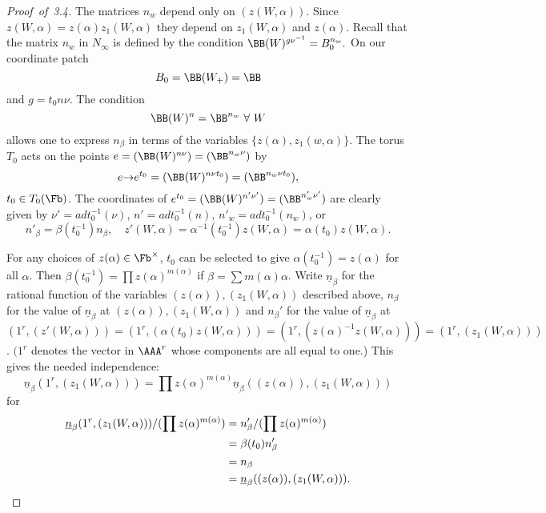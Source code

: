 \documentclass{memo-l}
\theoremstyle{definition}
\theoremstyle{remark}
\numberwithin{section}{chapter}
\numberwithin{equation}{chapter}
\begin{document}
\begin{proof}[Proof\ of\ 3.4]    The matrices $n_{w}$ depend only on $(z(W,{\alpha}))$. 
 Since $z(W,{\alpha}) = z({\alpha})z_{1}(W,{\alpha})$ they depend on 
$z_1(W,{\alpha})$ and $z({\alpha})$. 
 Recall that the matrix $n_{w}$ in $N_{{\infty}}$ is defined by the condition 
${\BB}(W)^{g\nu^{-1}} = B_{0}^{n_w}.$  
On our
coordinate patch $$B_{0} = {\BB}(W_{+})={\BB}$$ and $g = t_{0}n{\nu}$. 
 The condition $${\BB}(W)^n  = 
{\BB}^{n_w} \ \forall \ W$$ allows one to 
express $n_{{\beta}}$ in terms of the variables 
$\{z({\alpha}),z_{1}(w,\alpha)\}$.   The torus $T_{0}$ acts on the points 
$e = ({\BB}(W)^{n\nu}) = 
({\BB}^{n_w\nu})$ by $$e {\to} e^{t_0}  = ({\BB}(W)^{n\nu t_0}) = 
({\BB}^{n_w\nu t_0}),$$ $t_{0} \in T_{0}(\Fb)$. 
The coordinates of $e^{t_0}  = ({\BB}(W)^{n'{\nu}'}) = 
({\BB}^{n_{w}'{\nu}'})$ are clearly given by ${\nu}' = 
adt_0^{-1}({\nu})$, $n' = adt_0^{-1}(n)$, $n'_{w} = 
adt_0^{-1}(n_{w})$, or $$n'_{{\beta}} = {\beta}(t_0^{-1})n_{{\beta}},\quad 
z'(W,{\alpha}) = {\alpha}^{-1}(t_0^{-1})z(W,{\alpha}) = 
{\alpha}(t_0)z(W,{\alpha}).$$

   For any choices of $z({\alpha}) \in \Fb^{\times}$, $t_0$ can be selected 
to give ${\alpha}(t_0^{-1}) = z({\alpha})$ for all ${\alpha}$. 
 Then ${\beta}(t_0^{-1}) = \prod z({\alpha})^{m({\alpha})}$  if ${\beta} = 
\sum m({\alpha}){\alpha}$. 
 Write $\underline{n}_{{\beta}}$ for the rational function of the variables 
$(z({\alpha})),(z_1(W,{\alpha}))$ described above, $n_{{\beta}}$ for the 
value of $\underline{n}_{{\beta}}$ at $(z({\alpha})),(z_{1}(W,{\alpha}))$ and 
$n_{{\beta}}'$ for the value of $\underline{n} _{{\beta}}$ at 
$(1^r,(z'(W,{\alpha}))) = 
(1^r,({\alpha}(t_{0})z(W,{\alpha}))) = (1^r,
(z({\alpha})^{-1}z(W,{\alpha}))) = (1^r,(z_{1}(W,{\alpha})))$. 
 $(1^r$ denotes the vector in ${\AAA}^r$ whose components 
are all equal to one.)  This gives the needed independence:
$$
\underline{n}_{{\beta}}(1^r,(z_{1}(W,{\alpha}))) =
\prod z({\alpha})^{m({\alpha})}\underline{n}_{{\beta}}((z({\alpha})),
(z_{1}(W,{\alpha})))
$$
for 
$$
\aligned
\underline{n}_{{\beta}}(1^r,(z_{1}(W,{\alpha})))/(\prod 
z({\alpha})^{m({\alpha})}) &= n'_{{\beta}}/(\prod z({\alpha})^{m({\alpha})}) \\
&= {\beta}(t_0)n'_\beta \\ 
&= n_\beta \\
&= \underline{n}_{{\beta}}((z({\alpha})),(z_{1}(W,{\alpha}))).
\endaligned
$$



\end{proof}
\end{document}
